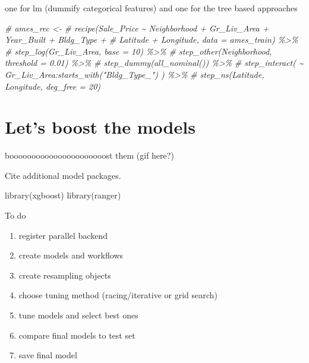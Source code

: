 \documentclass[
]{book}
\newenvironment{Shaded}{\begin{snugshade}}{\end{snugshade}}
\newcommand{\CommentTok}[1]{\textcolor[rgb]{0.56,0.35,0.01}{\textit{#1}}}
\newcommand{\FunctionTok}[1]{\textcolor[rgb]{0.00,0.00,0.00}{#1}}
\newcommand{\NormalTok}[1]{#1}
\begin{document}
one for lm (dummify categorical features) and one for the tree based approaches

\begin{Shaded}
\begin{Highlighting}[]
\CommentTok{\# ames\_rec \textless{}{-} }
\CommentTok{\#   recipe(Sale\_Price \textasciitilde{} Neighborhood + Gr\_Liv\_Area + Year\_Built + Bldg\_Type + }
\CommentTok{\#            Latitude + Longitude, data = ames\_train) \%\textgreater{}\%}
\CommentTok{\#   step\_log(Gr\_Liv\_Area, base = 10) \%\textgreater{}\% }
\CommentTok{\#   step\_other(Neighborhood, threshold = 0.01) \%\textgreater{}\% }
\CommentTok{\#   step\_dummy(all\_nominal()) \%\textgreater{}\% }
\CommentTok{\#   step\_interact( \textasciitilde{} Gr\_Liv\_Area:starts\_with("Bldg\_Type\_") ) \%\textgreater{}\% }
\CommentTok{\#   step\_ns(Latitude, Longitude, deg\_free = 20)}
\end{Highlighting}
\end{Shaded}

\hypertarget{modeling}{%
\chapter{Let's boost the models}\label{modeling}}

boooooooooooooooooooooost them (gif here?)

Cite additional model packages.\citep[\citet{ranger_package}]{xgboost_package}

\begin{Shaded}
\begin{Highlighting}[]
\FunctionTok{library}\NormalTok{(xgboost)}
\FunctionTok{library}\NormalTok{(ranger)}
\end{Highlighting}
\end{Shaded}

To do

\begin{enumerate}
\def\labelenumi{\arabic{enumi}.}
\item
  register parallel backend
\item
  create models and workflows
\item
  create resampling objects
\item
  choose tuning method (racing/iterative or grid search)
\item
  tune models and select best ones
\item
  compare final models to test set
\item
  save final model
\end{enumerate}
\end{document}
